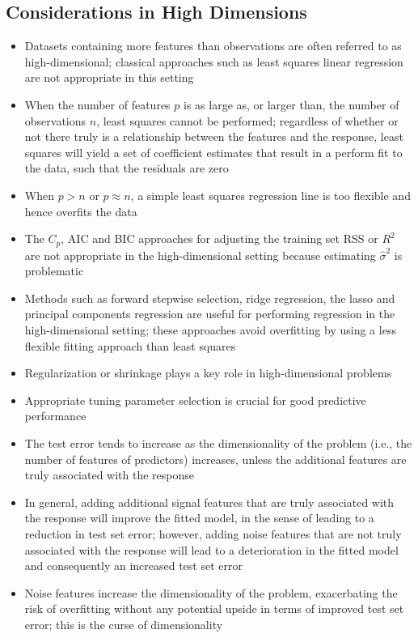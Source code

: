 \documentclass[12pt]{article}
\begin{document}
\subsection{Considerations in High Dimensions}
\begin{itemize} 
\item Datasets containing more features than observations are often referred to as high-dimensional; classical approaches such as least squares linear regression are not appropriate in this setting 
\item When the number of features $p$ is as large as, or larger than, the number of observations $n$, least squares cannot be performed; regardless of whether or not there truly is a relationship between the features and the response, least squares will yield a set of coefficient estimates that result in a perform fit to the data, such that the residuals are zero 
\item When $p > n$ or $p \approx n$, a simple least squares regression line is too flexible and hence overfits the data 
\item The $C_p$, AIC and BIC approaches for adjusting the training set RSS or $R^2$ are not appropriate in the high-dimensional setting because estimating $\hat{\sigma}^2$ is problematic 
\item Methods such as forward stepwise selection, ridge regression, the lasso and principal components regression are useful for performing regression in the high-dimensional setting; these approaches avoid overfitting by using a less flexible fitting approach than least squares 
\item Regularization or shrinkage plays a key role in high-dimensional problems 
\item Appropriate tuning parameter selection is crucial for good predictive performance
\item The test error tends to increase as the dimensionality of the problem (i.e., the number of features of predictors) increases, unless the additional features are truly associated with the response 
\item In general, adding additional signal features that are truly associated with the response will improve the fitted model, in the sense of leading to a reduction in test set error; however, adding noise features that are not truly associated with the response will lead to a deterioration in the fitted model and consequently an increased test set error
\item Noise features increase the dimensionality of the problem, exacerbating the risk of overfitting without any potential upside in terms of improved test set error; this is the curse of dimensionality 

\end{itemize}
\end{document}
